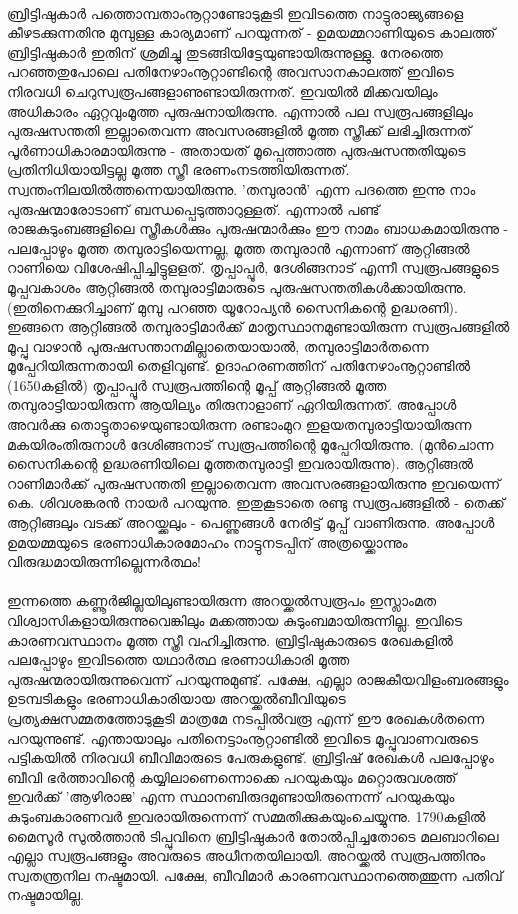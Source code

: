 \paragraph{}ബ്രിട്ടിഷുകാർ പത്തൊമ്പതാംനൂറ്റാണ്ടോടുകൂടി ഇവിടത്തെ നാട്ടുരാജ്യങ്ങളെ കീഴടക്കുന്നതിനു മുമ്പുള്ള കാര്യമാണ് പറയുന്നത് - ഉമയമ്മറാണിയുടെ കാലത്ത് ബ്രിട്ടിഷുകാർ ഇതിന് ശ്രമിച്ചു തുടങ്ങിയിട്ടേയുണ്ടായിരുന്നുള്ളു. നേരത്തെ പറഞ്ഞതുപോലെ പതിനേഴാംനൂറ്റാണ്ടിന്റെ അവസാനകാലത്ത് ഇവിടെ നിരവധി ചെറുസ്വരൂപങ്ങളാണുണ്ടായിരുന്നത്. ഇവയിൽ മിക്കവയിലും അധികാരം ഏറ്റവുംമൂത്ത പുരുഷനായിരുന്നു. എന്നാൽ പല സ്വരൂപങ്ങളിലും പുരുഷസന്തതി ഇല്ലാതെവന്ന അവസരങ്ങളിൽ മൂത്ത സ്ത്രീക്ക് ലഭിച്ചിരുന്നത് പൂർണാധികാരമായിരുന്നു - അതായത് മൂപ്പെത്താത്ത പുരുഷസന്തതിയുടെ പ്രതിനിധിയായിട്ടല്ല മൂത്ത സ്ത്രീ ഭരണംനടത്തിയിരുന്നത്. സ്വന്തംനിലയിൽത്തന്നെയായിരുന്നു. 'തമ്പുരാൻ' എന്ന പദത്തെ ഇന്നു നാം പുരുഷന്മാരോടാണ് ബന്ധപ്പെടുത്താറുള്ളത്. എന്നാൽ പണ്ട് രാജകുടുംബങ്ങളിലെ സ്ത്രീകൾക്കും പുരുഷന്മാർക്കും ഈ നാമം ബാധകമായിരുന്നു - പലപ്പോഴും മൂത്ത തമ്പുരാട്ടിയെന്നല്ല, മൂത്ത തമ്പുരാൻ എന്നാണ് ആറ്റിങ്ങൽ റാണിയെ വിശേഷിപ്പിച്ചിട്ടുളളത്. തൃപ്പാപ്പൂർ, ദേശിങ്ങനാട് എന്നീ സ്വരൂപങ്ങളുടെ മൂപ്പവകാശം ആറ്റിങ്ങൽ തമ്പുരാട്ടിമാരുടെ പുരുഷസന്തതികൾക്കായിരുന്നു. (ഇതിനെക്കുറിച്ചാണ് മുമ്പു പറഞ്ഞ യൂറോപ്യൻ സൈനികന്റെ ഉദ്ധരണി). ഇങ്ങനെ ആറ്റിങ്ങൽ തമ്പുരാട്ടിമാർക്ക് മാതൃസ്ഥാനമുണ്ടായിരുന്ന സ്വരൂപങ്ങളിൽ മൂപ്പു വാഴാൻ പുരുഷസന്താനമില്ലാതെയായാൽ, തമ്പുരാട്ടിമാർതന്നെ മൂപ്പേറിയിരുന്നതായി തെളിവുണ്ട്. ഉദാഹരണത്തിന് പതിനേഴാംനൂറ്റാണ്ടിൽ (1650കളിൽ) തൃപ്പാപ്പൂർ സ്വരൂപത്തിന്റെ മൂപ്പ് ആറ്റിങ്ങൽ മൂത്ത തമ്പുരാട്ടിയായിരുന്ന ആയില്യം തിരുനാളാണ് ഏറിയിരുന്നത്. അപ്പോൾ അവർക്കു തൊട്ടുതാഴെയുണ്ടായിരുന്ന രണ്ടാംമുറ ഇളയതമ്പുരാട്ടിയായിരുന്ന മകയിരംതിരുനാൾ ദേശിങ്ങനാട് സ്വരൂപത്തിന്റെ മൂപ്പേറിയിരുന്നു. (മുൻചൊന്ന സൈനികന്റെ ഉദ്ധരണിയിലെ മൂത്തതമ്പുരാട്ടി ഇവരായിരുന്നു). ആറ്റിങ്ങൽ റാണിമാർക്ക് പുരുഷസന്തതി ഇല്ലാതെവന്ന അവസരങ്ങളായിരുന്നു ഇവയെന്ന് കെ. ശിവശങ്കരൻ നായർ പറയുന്നു. ഇതുകൂടാതെ രണ്ടു സ്വരൂപങ്ങളിൽ - തെക്ക് ആറ്റിങ്ങലും വടക്ക് അറയ്ക്കലും - പെണ്ണുങ്ങൾ നേരിട്ട് മൂപ്പ് വാണിരുന്നു. അപ്പോൾ ഉമയമ്മയുടെ ഭരണാധികാരമോഹം നാട്ടുനടപ്പിന് അത്രയ്ക്കൊന്നും വിരുദ്ധമായിരുന്നില്ലെന്നർത്ഥം!


\paragraph{}ഇന്നത്തെ കണ്ണൂർജില്ലയിലുണ്ടായിരുന്ന അറയ്ക്കൽസ്വരൂപം ഇസ്ലാംമത വിശ്വാസികളായിരുന്നുവെങ്കിലും മക്കത്തായ കുടുംബമായിരുന്നില്ല. ഇവിടെ കാരണവസ്ഥാനം മൂത്ത സ്ത്രീ വഹിച്ചിരുന്നു. ബ്രിട്ടിഷുകാരുടെ രേഖകളിൽ പലപ്പോഴും ഇവിടത്തെ യഥാർത്ഥ ഭരണാധികാരി മൂത്ത പുരുഷന്മരായിരുന്നുവെന്ന് പറയുന്നുമുണ്ട്. പക്ഷേ, എല്ലാ രാജകീയവിളംബരങ്ങളും ഉടമ്പടികളും ഭരണാധികാരിയായ അറയ്ക്കൽബീവിയുടെ പ്രത്യക്ഷസമ്മതത്തോടുകൂടി മാത്രമേ നടപ്പിൽവരൂ എന്ന് ഈ രേഖകൾതന്നെ പറയുന്നുണ്ട്. എന്തായാലും പതിനെട്ടാംനൂറ്റാണ്ടിൽ ഇവിടെ മൂപ്പുവാണവരുടെ പട്ടികയിൽ നിരവധി ബീവിമാരുടെ പേരുകളുണ്ട്. ബ്രിട്ടിഷ്‌ രേഖകൾ പലപ്പോഴും ബീവി ഭർത്താവിന്റെ കയ്യിലാണെന്നൊക്കെ പറയുകയും മറ്റൊരുവശത്ത് ഇവർക്ക് 'ആഴിരാജ' എന്ന സ്ഥാനബിരുദമുണ്ടായിരുന്നെന്ന് പറയുകയും കുടുംബകാരണവർ ഇവരായിരുന്നെന്ന് സമ്മതിക്കുകയുംചെയ്യുന്നു. 1790കളിൽ മൈസൂർ സുൽത്താൻ ടിപ്പുവിനെ ബ്രിട്ടിഷുകാർ തോൽപ്പിച്ചതോടെ മലബാറിലെ എല്ലാ സ്വരൂപങ്ങളും അവരുടെ അധീനതയിലായി. അറയ്ക്കൽ സ്വരൂപത്തിനും സ്വതന്ത്രനില നഷ്ടമായി. പക്ഷേ, ബീവിമാർ കാരണവസ്ഥാനത്തെത്തുന്ന പതിവ് നഷ്ടമായില്ല.

